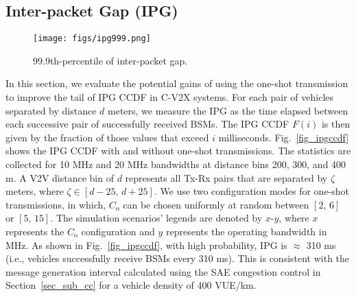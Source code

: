 \documentclass[conference]{IEEEtran}
\begin{document}
\subsection{Inter-packet Gap (IPG)}\label{sec_sub_ipg}

\begin{figure*}
\caption{CCDF of inter-packet gap.}
\vspace{-.25in}
\label{fig_ipgccdf}
\end{figure*}

\begin{figure}
  \begin{center}
  \texttt{[image: figs/ipg999.png]}
  \caption{99.9th-percentile of inter-packet gap.}\label{fig_ipg999}
  \vspace{-.35in}
  \end{center}
\end{figure}
In this section, we evaluate the potential gains of using the one-shot transmission to improve the tail of IPG CCDF in C-V2X systems. For each pair of vehicles separated by distance $d$ meters, we measure the IPG as the time elapsed between each successive pair of successfully received BSMs. The IPG CCDF $F(i)$ is then given by the fraction of those values that exceed $i$ milliseconds. Fig.~\ref{fig_ipgccdf} shows the IPG CCDF with and without one-shot transmissions. The statistics are collected for 10 MHz and 20 MHz bandwidths at distance bins 200, 300, and 400 m. A V2V distance bin of $d$ represents all Tx-Rx pairs that are separated by $\zeta$ meters, where $\zeta\in{[d-25,\,d+25]}$. We use two configuration modes for one-shot transmissions, in which, $C_{\mathrm{o}}$ can be chosen uniformly at random between $[2,\,6]$ or $[5,\,15]$. The simulation scenarios' legends are denoted by $x$-$y$, where $x$ represents the $C_{\mathrm{o}}$ configuration and $y$ represents the operating bandwidth in MHz. As shown in Fig.~\ref{fig_ipgccdf}, with high probability, IPG is $\approx$ 310 ms (i.e., vehicles successfully receive BSMs every 310 ms). This is consistent with the message generation interval calculated using the SAE congestion control in Section~\ref{sec_sub_cc} for a vehicle density of 400 VUE/km.
\end{document}

